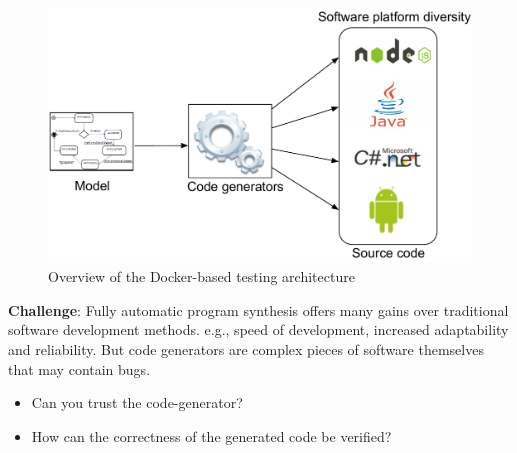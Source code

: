 \begin{figure}[h]
	\center
	\includegraphics[scale=0.65]{Background/fig/software-diversity.pdf}
	\caption{Overview of the Docker-based testing architecture}
\end{figure}


\textbf{Challenge}: Fully automatic program synthesis offers many gains over traditional software development methods. e.g., speed of development, increased adaptability and reliability. But code generators are complex pieces of software themselves that may contain bugs.
\begin{itemize}
\item Can you trust the code-generator?
\item How can the correctness of the generated code be verified?
\end{itemize}

